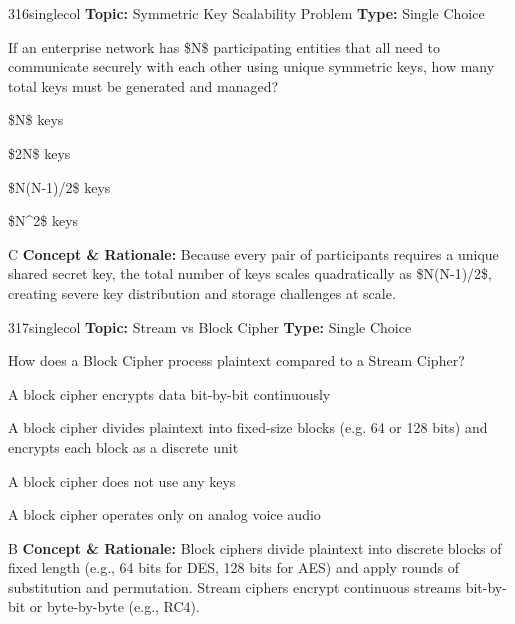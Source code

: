 \begin{qcard}{316}{singlecol}
\textcolor{darkslate!75}{\small\textbf{Topic:} Symmetric Key Scalability Problem \hfill \textbf{Type:} Single Choice}\vspace{0.4em}\par
If an enterprise network has \$N\$ participating entities that all need to communicate securely with each other using unique symmetric keys, how many total keys must be generated and managed?
\begin{qoptions}
\item \$N\$ keys
\item \$2N\$ keys
\item \$N(N-1)/2\$ keys
\item \$N\textasciicircum{}2\$ keys
\end{qoptions}
\end{qcard}
\nopagebreak
\begin{explainbox}{C}
\textbf{Concept \& Rationale:} Because every pair of participants requires a unique shared secret key, the total number of keys scales quadratically as \$N(N-1)/2\$, creating severe key distribution and storage challenges at scale.
\end{explainbox}

\begin{qcard}{317}{singlecol}
\textcolor{darkslate!75}{\small\textbf{Topic:} Stream vs Block Cipher \hfill \textbf{Type:} Single Choice}\vspace{0.4em}\par
How does a Block Cipher process plaintext compared to a Stream Cipher?
\begin{qoptions}
\item A block cipher encrypts data bit-by-bit continuously
\item A block cipher divides plaintext into fixed-size blocks (e.g. 64 or 128 bits) and encrypts each block as a discrete unit
\item A block cipher does not use any keys
\item A block cipher operates only on analog voice audio
\end{qoptions}
\end{qcard}
\nopagebreak
\begin{explainbox}{B}
\textbf{Concept \& Rationale:} Block ciphers divide plaintext into discrete blocks of fixed length (e.g., 64 bits for DES, 128 bits for AES) and apply rounds of substitution and permutation. Stream ciphers encrypt continuous streams bit-by-bit or byte-by-byte (e.g., RC4).
\end{explainbox}

